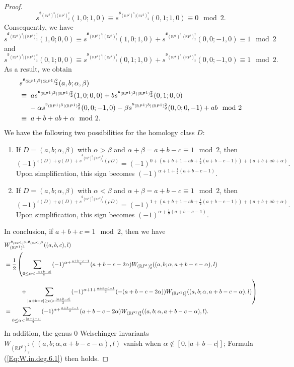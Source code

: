\documentclass[11pt]{amsart}
\numberwithin{equation}{section}
\theoremstyle{definition}
\theoremstyle{plain}
\theoremstyle{remark}
\newcommand{\R}{\mathbb{R}}
\begin{document}
\begin{proof}
$$s^{\mathfrak{s}_{(\R P^1)^3|(\R P^1)^2_2}}(1,0;1,0)\equiv s^{\mathfrak{s}_{(\R P^1)^3|(\R P^1)^2_2}}(0,1;1,0)\equiv 0 \mod 2.$$
Consequently, we have
$$s^{\mathfrak{s}_{(\R P^1)^3|(\R P^1)^2_2}}(1,0;0,0)\equiv s^{\mathfrak{s}_{(\R P^1)^3|(\R P^1)^2_2}}(1,0;1,0) +s^{\mathfrak{s}_{(\R P^1)^3|(\R P^1)^2_2}}(0,0;-1,0) \equiv 1 \mod 2$$
and
$$s^{\mathfrak{s}_{(\R P^1)^3|(\R P^1)^2_2}}(0,1;0,0) \equiv s^{\mathfrak{s}_{(\R P^1)^3|(\R P^1)^2_2}}(0,1;1,0) +s^{\mathfrak{s}_{(\R P^1)^3|(\R P^1)^2_2}}(0,0;-1,0)\equiv 1 \mod 2.$$
As a result, we obtain
\begin{align*}
    &s^{\mathfrak{s}_{(\R P^1)^3|(\R P^1)^2_2}}(a,b;\alpha,\beta)\\
    &\equiv  \; a s^{\mathfrak{s}_{(\R P^1)^3|(\R P^1)^2_2}}(1,0;0,0)+bs^{\mathfrak{s}_{(\R P^1)^3|(\R P^1)^2_2}}(0,1;0,0) \\
    &\hphantom{\equiv}\;\; -\alpha s^{\mathfrak{s}_{(\R P^1)^3|(\R P^1)^2_2}}(0,0;-1,0)-\beta  s^{\mathfrak{s}_{(\R P^1)^3|(\R P^1)^2_2}}(0,0;0,-1)+ab \mod 2\\
    & \equiv  \; a+b+ab+\alpha \mod 2.
\end{align*}
We have the following two possibilities for the homology class $D$:
\begin{enumerate}
    \item If $D=(a,b;\alpha,\beta)$ with $\alpha>\beta$ and  $\alpha + \beta= a+b-c \equiv 1 \mod 2$, then
$$(-1)^{\epsilon(D)+g(D)+s^{\mathfrak{s}_{(\R P^1)^3|(\R P^1)^2_2}}(\rho D)}=(-1)^{0+(a+b+1+ab+\frac{1}{2}(a+b-c-1))+(a+b+ab+\alpha)}.$$
Upon simplification, this sign becomes $(-1)^{\alpha+1+\frac{1}{2}(a+b-c-1)}$.
    \item  If $D=(a,b;\alpha,\beta)$ with $\alpha<\beta$ and $\alpha + \beta= a+b-c \equiv 1 \mod 2$, then
$$(-1)^{\epsilon(D)+g(D)+s^{\mathfrak{s}_{(\R P^1)^3|(\R P^1)^2_2}}(\rho D)}=(-1)^{1+(a+b+1+ab+\frac{1}{2}(a+b-c-1))+(a+b+ab+\alpha)}.$$
Upon simplification,  this sign becomes $(-1)^{\alpha+\frac{1}{2}(a+b-c-1)}$.
\end{enumerate}
In conclusion, if $a+b +c= 1 \mod 2$, then we have
\begin{align*}
    & W_{(\R P^1)^3}^{\mathfrak{s}_{(\R P^1)^3},\mathfrak{o}_{(\R P^1)^3}}((a,b,c),l)\\
  &=\frac{1}{2}\left(\sum_{0\leq \alpha<\frac{|a+b-c|}{2}}(-1)^{\alpha +\frac{a+b-c-1}{2}} (a+b-c-2\alpha) W_{(\R P^1)^2_2} ((a,b;\alpha,a+b-c-\alpha),l)\right.\\
  &\hphantom{=\frac{1}{2}\Big(}\left.\; +\sum_{|a+b-c|\geq \alpha>\frac{|a+b-c|}{2}}(-1)^{\alpha +1+\frac{a+b-c-1}{2}} (-(a+b-c-2\alpha)) W_{(\R P^1)^2_2} ((a,b;\alpha,a+b-c-\alpha),l) \right)\\
    &=\sum_{0\leq \alpha<\frac{|a+b-c|}{2}}(-1)^{\alpha +\frac{a+b-c-1}{2}} (a+b-c-2\alpha) W_{(\R P^1)^2_2} ((a,b;\alpha,a+b-c-\alpha),l).
\end{align*}
In addition, the genus $0$ Welschinger invariants $W_{(\R P^1)^2_2} ((a,b;\alpha,a+b-c-\alpha),l)$ vanish when $\alpha \notin [0,|a+b-c|]$;  
Formula (\ref{Eq:W.in.deg.6.1}) then holds.
\end{proof}
\end{document}
